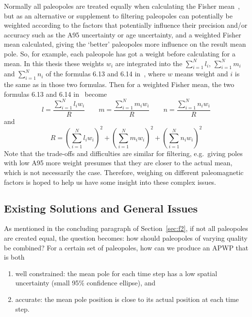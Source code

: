 Normally all paleopoles are treated equally when calculating the Fisher
mean~\citep[see how to calculate a Fisher mean using the formulas 6.12, 6.13,
6.14 and 6.15 in][chap. 6; note that instead of direction declination and
inclination expected in those formulas, pole longitude and latitude should be
used]{B92}, but as an alternative or supplement to filtering paleopoles can
potentially be weighted according to the factors that potentially influence
their precision and/or accuracy such as the A95 uncertainty or age uncertainty,
and a weighted Fisher mean calculated, giving the `better' paleopoles more
influence on the result mean pole. So, for example, each paleopole has got a
weight before calculating for a mean. In this thesis these weights $w_i$
are integrated into the $\sum\limits_{i=1}^N l_i$, $\sum\limits_{i=1}^N m_i$ and
$\sum\limits_{i=1}^N n_i$ of the formulas 6.13 and 6.14 in~\citet[chap.~6]{B92},
where $w$ means weight and $i$ is the same as in those two formulas. Then for a
weighted Fisher mean, the two formulas 6.13 and 6.14 in~\citet[chap.~6]{B92}
become
%
\begin{equation}
  l = \frac{\sum\limits_{i=1}^N l_{i}w_i}{R} \quad\quad
  m = \frac{\sum\limits_{i=1}^N m_{i}w_i}{R} \quad\quad
  n = \frac{\sum\limits_{i=1}^N n_{i}w_i}{R}
\end{equation}
%
and
%
\begin{equation}
  R = {\left( \sum\limits_{i=1}^N l_{i}w_i \right)}^2
    + {\left( \sum\limits_{i=1}^N m_{i}w_i \right)}^2
    + {\left( \sum\limits_{i=1}^N n_{i}w_i \right)}^2
\end{equation}
%
Note that the trade-offs and difficulties are similar for filtering, e.g.\
giving poles with low A95 more weight presumes that they are closer to the
actual mean, which is not necessarily the case. Therefore, weighing on different
paleomagnetic factors is hoped to help us have some insight into these complex
issues.

\subsection{Existing Solutions and General Issues}\label{sec:si}

As mentioned in the concluding paragraph of Section~\ref{sec:f2}, if not all
paleopoles are created equal, the question becomes: how should paleopoles of
varying quality be combined? For a certain set of paleopoles, how can we produce
an APWP that is both
\begin{enumerate}
  \item well constrained: the mean pole for each time step has a low spatial
    uncertainty (small 95\% confidence ellipse), and
  \item accurate: the mean pole position is close to its actual position at each
    time step.
\end{enumerate}

